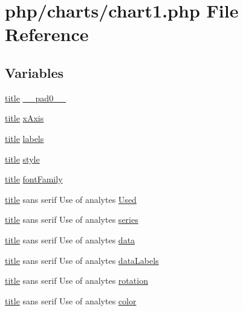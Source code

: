 \hypertarget{chart1_8php}{\section{php/charts/chart1.php File Reference}
\label{chart1_8php}
}
\subsection*{Variables}
\begin{DoxyCompactItemize}
\item 
\hyperlink{chart1_8php_a256dc75681c13d8a64135187612ba0ee}{title} \hyperlink{chart1_8php_aa6d173daeb1f78a82e89d75a4e948f24}{\-\_\-\-\_\-pad0\-\_\-\-\_\-}
\item 
\hyperlink{chart1_8php_a256dc75681c13d8a64135187612ba0ee}{title} \hyperlink{chart1_8php_a85ea519cf3eb0270da0091d07e8ee727}{x\-Axis}
\item 
\hyperlink{chart1_8php_a256dc75681c13d8a64135187612ba0ee}{title} \hyperlink{chart1_8php_aa76eb72ed8894c2f5448631b03964879}{labels}
\item 
\hyperlink{chart1_8php_a256dc75681c13d8a64135187612ba0ee}{title} \hyperlink{chart1_8php_a1659ed273dcf8f4bf89ff39127637cd1}{style}
\item 
\hyperlink{chart1_8php_a256dc75681c13d8a64135187612ba0ee}{title} \hyperlink{chart1_8php_a61b4126a795dc35aff6108a017a6c950}{font\-Family}
\item 
\hyperlink{chart1_8php_a256dc75681c13d8a64135187612ba0ee}{title} sans serif Use of analytes \hyperlink{chart1_8php_a8257e1ad81b4a9ebf5a380357ca8aa0d}{Used}
\item 
\hyperlink{chart1_8php_a256dc75681c13d8a64135187612ba0ee}{title} sans serif Use of analytes \hyperlink{chart1_8php_aba4b72d8f1b3e6b391ab41ca542f005a}{series}
\item 
\hyperlink{chart1_8php_a256dc75681c13d8a64135187612ba0ee}{title} sans serif Use of analytes \hyperlink{chart1_8php_ab3ed669f4b3fdb8c88f3a190fb907de0}{data}
\item 
\hyperlink{chart1_8php_a256dc75681c13d8a64135187612ba0ee}{title} sans serif Use of analytes \hyperlink{chart1_8php_a6cc4de94e7120b93b61ba6c324467460}{data\-Labels}
\item 
\hyperlink{chart1_8php_a256dc75681c13d8a64135187612ba0ee}{title} sans serif Use of analytes \hyperlink{chart1_8php_a389898f41b29820945784f375c8fca58}{rotation}
\item 
\hyperlink{chart1_8php_a256dc75681c13d8a64135187612ba0ee}{title} sans serif Use of analytes \hyperlink{chart1_8php_ae68251bab2d16bd206603de96a155284}{color}

\end{DoxyCompactItemize}
